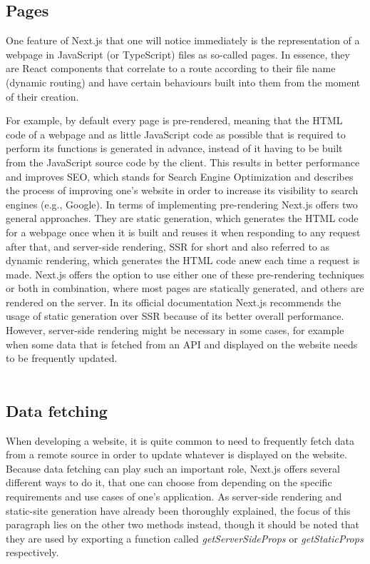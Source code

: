 \subsection{Pages}
One feature of Next.js that one will notice immediately is the representation of a webpage in JavaScript (or TypeScript) files as
so-called pages. In essence, they are React components that correlate to a route according to their file name (dynamic routing) and
have certain behaviours built into them from the moment of their creation.

For example, by default every page is pre-rendered, meaning that the HTML code of a webpage and as little JavaScript code as possible
that is required to perform its functions is generated in advance, instead of it having to be built from the JavaScript source code by
the client. This results in better performance and improves SEO, which stands for Search Engine Optimization and describes the process
of improving one's website in order to increase its visibility to search engines (e.g., Google). In terms of implementing pre-rendering
Next.js offers two general approaches. They are static generation, which generates the HTML code for a webpage once when it is built
and reuses it when responding to any request after that, and server-side rendering, SSR for short and also referred to as dynamic
rendering, which generates the HTML code anew each time a request is made. Next.js offers the option to use either one of these pre-rendering
techniques or both in combination, where most pages are statically generated, and others are rendered on the server. In its official
documentation Next.js recommends the usage of static generation over SSR because of its better overall performance. However, server-side
rendering might be necessary in some cases, for example when some data that is fetched from an API and displayed on the website needs
to be frequently updated. \cite{NextjsPages}
\\
\\
\subsection{Data fetching}
When developing a website, it is quite common to need to frequently fetch data from a remote source in order to update whatever is displayed
on the website. Because data fetching can play such an important role, Next.js offers several different ways to do it, that one can choose
from depending on the specific requirements and use cases of one's application. As server-side rendering and static-site generation have already
been thoroughly explained, the focus of this paragraph lies on the other two methods instead, though it should be noted that they are used by
exporting a function called \emph{getServerSideProps} or \emph{getStaticProps} respectively.

